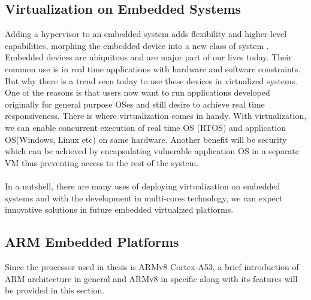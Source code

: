 \subsection{Virtualization on Embedded Systems\label{sec:itu}}
 Adding a hypervisor to an embedded system adds flexibility and higher-level capabilities, morphing the embedded device into a new class of system \cite{ibm}. Embedded devices are ubiquitous and are major part of our lives today. Their common use is in real time applications with hardware and software constraints. But why there is a trend seen today to use these devices in virtualized systems. One of the reasons is that users now want to run applications developed originally for general purpose OSes and still desire to achieve real time responsiveness. There is where virtualization comes in handy. With virtualization, we can enable concurrent execution of real time OS (RTOS) and application OS(Windows, Linux etc) on same hardware. Another benefit will be security which can be achieved by encapsulating vulnerable application OS in a separate VM thus preventing access to the rest of the system.
 \\
 \\
 In a nutshell, there are many uses of deploying virtualization on embedded systems and with the development in multi-cores technology, we can expect innovative solutions in future embedded virtualized platforms. 

\subsection{ARM Embedded Platforms\label{sec:itu}}
Since the processor used in thesis is ARMv8 Cortex-A53, a brief introduction of ARM architecture in general and ARMv8 in specific along with its features will be provided in this section.
